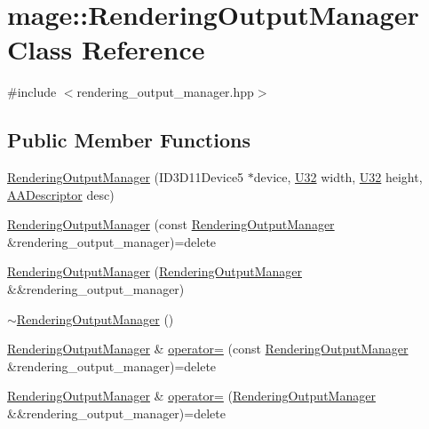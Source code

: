 \hypertarget{classmage_1_1_rendering_output_manager}{}\section{mage\+:\+:Rendering\+Output\+Manager Class Reference}
\label{classmage_1_1_rendering_output_manager}


{\ttfamily \#include $<$rendering\+\_\+output\+\_\+manager.\+hpp$>$}

\subsection*{Public Member Functions}
\begin{DoxyCompactItemize}
\item 
\hyperlink{classmage_1_1_rendering_output_manager_acbf3f32fdfaeb97e100c07b2197fe0b7}{Rendering\+Output\+Manager} (I\+D3\+D11\+Device5 $\ast$device, \hyperlink{namespacemage_a41c104c036fba3756a74e19f793eeaa1}{U32} width, \hyperlink{namespacemage_a41c104c036fba3756a74e19f793eeaa1}{U32} height, \hyperlink{namespacemage_a86cd40b8f2f42ca4d616cc6ec665a7f2}{A\+A\+Descriptor} desc)
\item 
\hyperlink{classmage_1_1_rendering_output_manager_aba36b667b7f34cc23858050a7713f4fa}{Rendering\+Output\+Manager} (const \hyperlink{classmage_1_1_rendering_output_manager}{Rendering\+Output\+Manager} \&rendering\+\_\+output\+\_\+manager)=delete
\item 
\hyperlink{classmage_1_1_rendering_output_manager_a2ffb191fb849e740921c42638e3ea507}{Rendering\+Output\+Manager} (\hyperlink{classmage_1_1_rendering_output_manager}{Rendering\+Output\+Manager} \&\&rendering\+\_\+output\+\_\+manager)
\item 
\hyperlink{classmage_1_1_rendering_output_manager_ac6c1b4ce353870ea603982623962b2f4}{$\sim$\+Rendering\+Output\+Manager} ()
\item 
\hyperlink{classmage_1_1_rendering_output_manager}{Rendering\+Output\+Manager} \& \hyperlink{classmage_1_1_rendering_output_manager_a486005f24c4ba471522e827574099c0b}{operator=} (const \hyperlink{classmage_1_1_rendering_output_manager}{Rendering\+Output\+Manager} \&rendering\+\_\+output\+\_\+manager)=delete
\item 
\hyperlink{classmage_1_1_rendering_output_manager}{Rendering\+Output\+Manager} \& \hyperlink{classmage_1_1_rendering_output_manager_a1e3ae29b6a7b888ba1cf5b93840d09d1}{operator=} (\hyperlink{classmage_1_1_rendering_output_manager}{Rendering\+Output\+Manager} \&\&rendering\+\_\+output\+\_\+manager)=delete

\end{DoxyCompactItemize}
